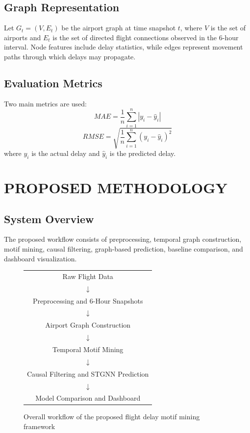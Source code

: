 \documentclass[12pt,a4paper]{report}
\begin{document}
\section{Graph Representation}
Let $G_t=(V,E_t)$ be the airport graph at time snapshot $t$, where $V$ is the set of airports and $E_t$ is the set of directed flight connections observed in the 6-hour interval. Node features include delay statistics, while edges represent movement paths through which delays may propagate.

\section{Evaluation Metrics}
Two main metrics are used:
\begin{equation}
	MAE = \frac{1}{n}\sum_{i=1}^{n}|y_i-\hat{y}_i|
\end{equation}
\begin{equation}
	RMSE = \sqrt{\frac{1}{n}\sum_{i=1}^{n}(y_i-\hat{y}_i)^2}
\end{equation}
where $y_i$ is the actual delay and $\hat{y}_i$ is the predicted delay.

\chapter{PROPOSED METHODOLOGY}
\noindent{\rule{\textwidth}{1.5pt}}

\section{System Overview}
The proposed workflow consists of preprocessing, temporal graph construction, motif mining, causal filtering, graph-based prediction, baseline comparison, and dashboard visualization.

\begin{figure}[H]
	\centering
	\begin{minipage}{0.9\textwidth}
	\centering
	\begin{tabular}{c}
	Raw Flight Data \\
	$\downarrow$ \\
	Preprocessing and 6-Hour Snapshots \\
	$\downarrow$ \\
	Airport Graph Construction \\
	$\downarrow$ \\
	Temporal Motif Mining \\
	$\downarrow$ \\
	Causal Filtering and STGNN Prediction \\
	$\downarrow$ \\
	Model Comparison and Dashboard
	\end{tabular}
	\end{minipage}
	\caption{Overall workflow of the proposed flight delay motif mining framework}
	\label{fig:workflow}
\end{figure}
\end{document}
